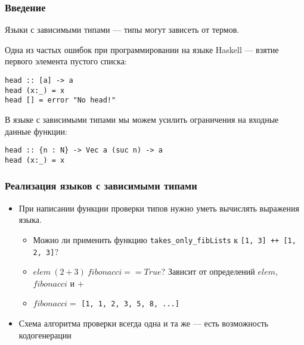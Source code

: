 
\begin{frame}[fragile]
\frametitle{Введение}

Языки с зависимыми типами --- типы могут зависеть от термов.

Одна из частых ошибок при программировании на языке Haskell --- взятие первого элемента пустого списка:

\begin{verbatim}
head :: [a] -> a
head (x:_) = x
head [] = error "No head!"
\end{verbatim}

В языке с зависимыми типами мы можем усилить ограничения на входные данные функции:

\begin{verbatim}
head :: {n : N} -> Vec a (suc n) -> a
head (x:_) = x
\end{verbatim}

\end{frame}

\begin{frame}
\frametitle{Реализация языков с зависимыми типами}

\begin{itemize}
\item При написании функции проверки типов нужно уметь вычислять выражения языка.
  \begin{itemize}
    \item Можно ли применить функцию \lstinline{takes_only_fibLists} к \lstinline{[1, 3] ++ [1, 2, 3]}?
    \item $elem\ (2 + 3)\ fibonacci == True$? Зависит от определений $elem$, $fibonacci$ и $+$
    \item $fibonacci =$ \lstinline{[1, 1, 2, 3, 5, 8, ...]}
  \end{itemize}
\item Схема алгоритма проверки всегда одна и та же --- есть возможность кодогенерации

\end{itemize}

\end{frame}

